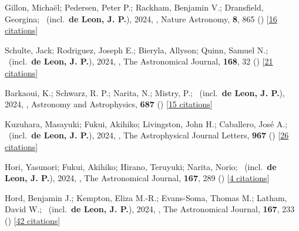 \item[{\color{numcolor}\scriptsize69}] Gillon, Micha{\"e}l; Pedersen, Peter P.; Rackham, Benjamin V.; Dransfield, Georgina; \etal\ (incl.\ \textbf{de Leon, J. P.}), 2024, , Nature Astronomy, \textbf{8}, 865 () [\href{https://ui.adsabs.harvard.edu/abs/2024NatAs...8..865G}{16 citations}]

\item[{\color{numcolor}\scriptsize68}] Schulte, Jack; Rodriguez, Joseph E.; Bieryla, Allyson; Quinn, Samuel N.; \etal\ (incl.\ \textbf{de Leon, J. P.}), 2024, , The Astronomical Journal, \textbf{168}, 32 () [\href{https://ui.adsabs.harvard.edu/abs/2024AJ....168...32S}{21 citations}]

\item[{\color{numcolor}\scriptsize67}] Barkaoui, K.; Schwarz, R. P.; Narita, N.; Mistry, P.; \etal\ (incl.\ \textbf{de Leon, J. P.}), 2024, , Astronomy and Astrophysics, \textbf{687} () [\href{https://ui.adsabs.harvard.edu/abs/2024A&A...687A.264B}{15 citations}]

\item[{\color{numcolor}\scriptsize66}] Kuzuhara, Masayuki; Fukui, Akihiko; Livingston, John H.; Caballero, Jos{\'e} A.; \etal\ (incl.\ \textbf{de Leon, J. P.}), 2024, , The Astrophysical Journal Letters, \textbf{967} () [\href{https://ui.adsabs.harvard.edu/abs/2024ApJ...967L..21K}{26 citations}]

\item[{\color{numcolor}\scriptsize65}] Hori, Yasunori; Fukui, Akihiko; Hirano, Teruyuki; Narita, Norio; \etal\ (incl.\ \textbf{de Leon, J. P.}), 2024, , The Astronomical Journal, \textbf{167}, 289 () [\href{https://ui.adsabs.harvard.edu/abs/2024AJ....167..289H}{4 citations}]

\item[{\color{numcolor}\scriptsize64}] Hord, Benjamin J.; Kempton, Eliza M.-R.; Evans-Soma, Thomas M.; Latham, David W.; \etal\ (incl.\ \textbf{de Leon, J. P.}), 2024, , The Astronomical Journal, \textbf{167}, 233 () [\href{https://ui.adsabs.harvard.edu/abs/2024AJ....167..233H}{42 citations}]

